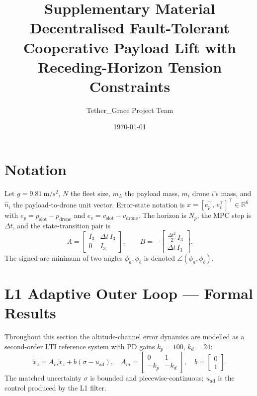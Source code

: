 \documentclass[11pt,a4paper]{article}
\title{Supplementary Material \\
       \large Decentralised Fault-Tolerant Cooperative Payload Lift with
       Receding-Horizon Tension Constraints}
\author{Tether\_Grace Project Team}
\date{\today}
\theoremstyle{plain}
\theoremstyle{definition}
\begin{document}
\maketitle
\tableofcontents

\section*{Notation}

Let $g=9.81~\si{\m\per\second\squared}$, $N$ the fleet size, $m_L$
the payload mass, $m_i$ drone $i$'s mass, and $\hat n_i$ the
payload-to-drone unit vector. Error-state notation is
$x = [e_p^\top,\, e_v^\top]^\top \in \mathbb R^6$ with
$e_p = p_\mathrm{slot} - p_\mathrm{drone}$ and
$e_v = v_\mathrm{slot} - v_\mathrm{drone}$. The horizon is $N_p$,
the MPC step is $\Delta t$, and the state-transition pair is
\begin{equation}
A = \begin{bmatrix} I_3 & \Delta t\, I_3 \\ 0 & I_3 \end{bmatrix},
\qquad
B = -\begin{bmatrix} \tfrac{\Delta t^2}{2}\, I_3 \\ \Delta t\, I_3 \end{bmatrix}.
\label{eq:ABstate}
\end{equation}
The signed-arc minimum of two angles $\phi_a,\phi_b$ is denoted
$\angle(\phi_a,\phi_b)$.

\section{L1 Adaptive Outer Loop --- Formal Results}
\label{sec:l1}

Throughout this section the altitude-channel error dynamics are
modelled as a second-order LTI reference system with PD gains
$k_p=100$, $k_d=24$:
\begin{equation}
  \dot{\tilde x}_z = A_m \tilde x_z + b(\sigma - u_\mathrm{ad}),
  \quad
  A_m = \begin{bmatrix}0 & 1\\ -k_p & -k_d\end{bmatrix},
  \quad b = \begin{bmatrix}0\\1\end{bmatrix}.
  \label{eq:l1-plant}
\end{equation}
The matched uncertainty $\sigma$ is bounded and piecewise-continuous;
$u_\mathrm{ad}$ is the control produced by the L1 filter.
\end{document}
